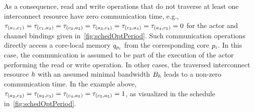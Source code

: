 As a consequence, read and write operations that do not traverse at least one interconnect resource have zero communication time, e.g., $\tau_{(a_1,c_1)} = \tau_{(c_1,a_2)} = \tau_{(c_2,a_3)} = \tau_{(a_3,c_4)} = \tau_{(c_3,a_4)} = \tau_{(a_4,c_5)} = 0$ for the actor and channel bindings given in~\cref{fig:schedOptPeriod}.
Such communication operations directly access a core-local memory $q_{p_i}$ from the corresponding core $p_i$.
In this case, the communication is assumed to be part of the execution of the actor performing the read or write operation.
In other cases, the traversed interconnect resource $h$ with an assumed minimal bandwidth $B_{h}$ leads to a non-zero communication time.
In the example above, $\tau_{(a_2,c_2)} = \tau_{(a_2,c_3)} = \tau_{(c_4,a_5)} =  \tau_{(c_5,a_5)} = 1$, as visualized in the schedule in~\cref{fig:schedOptPeriod}.

